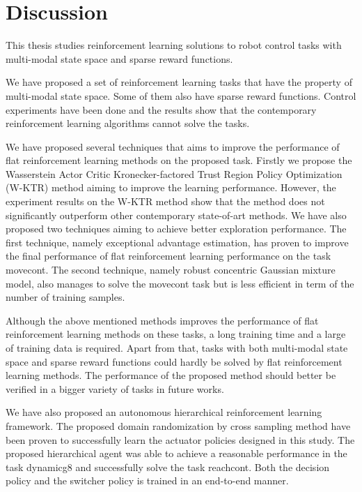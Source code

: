 \chapter{Discussion}
This thesis studies reinforcement learning solutions to robot control tasks with multi-modal state space and sparse reward functions.

We have proposed a set of reinforcement learning tasks that have the property of multi-modal state space. Some of them also have sparse reward functions. Control experiments have been done and the results show that the contemporary reinforcement learning algorithms cannot solve the tasks.

We have proposed several techniques that aims to improve the performance of flat reinforcement learning methods on the proposed task. Firstly we propose the Wasserstein Actor Critic Kronecker-factored Trust Region Policy Optimization (W-KTR) method aiming to improve the learning performance. However, the experiment results on the W-KTR method show that the method does not significantly outperform other contemporary state-of-art methods. We have also proposed two techniques aiming to achieve better exploration performance. The first technique, namely exceptional advantage estimation, has proven to improve the final performance of flat reinforcement learning performance on the task movecont. The second technique, namely robust concentric Gaussian mixture model, also manages to solve the movecont task but is less efficient in term of the number of training samples. 

Although the above mentioned methods improves the performance of flat reinforcement learning methods on these tasks, a long training time and a large of training data is required. Apart from that, tasks with both multi-modal state space and sparse reward functions could hardly be solved by flat reinforcement learning methods. The performance of the proposed method should better be verified in a bigger variety of tasks in future works.

We have also proposed an autonomous hierarchical reinforcement learning framework. The proposed domain randomization by cross sampling method have been proven to successfully learn the actuator policies designed in this study. The proposed hierarchical agent was able to achieve a reasonable performance in the task dynamicg8 and successfully solve the task reachcont. Both the decision policy and the switcher policy is trained in an end-to-end manner. 

